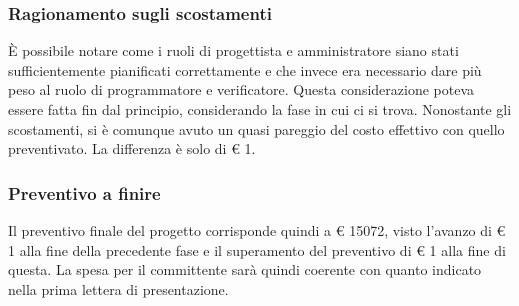 \subsubsection{Ragionamento sugli scostamenti}
È possibile notare come i ruoli di progettista e amministratore siano stati sufficientemente pianificati correttamente e che invece era necessario dare più peso al ruolo di programmatore e verificatore. Questa considerazione poteva essere fatta fin dal principio, considerando la fase in cui ci si trova.\newline
Nonostante gli scostamenti, si è comunque avuto un quasi pareggio del costo effettivo con quello preventivato. La differenza è solo di \euro{} 1.

\subsubsection{Preventivo a finire}
Il preventivo finale del progetto corrisponde quindi a \euro{} 15072, visto l'avanzo di \euro{} 1 alla fine della precedente fase e il superamento del preventivo di \euro{} 1 alla fine di questa. La spesa per il committente sarà quindi coerente con quanto indicato nella prima lettera di presentazione. 